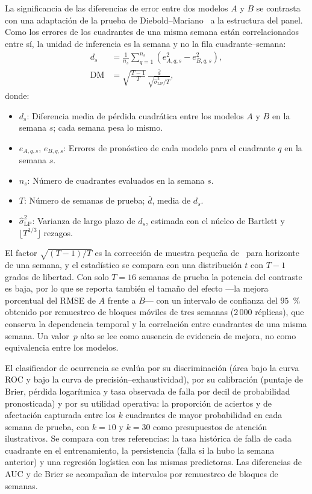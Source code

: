 La significancia de las diferencias de error entre dos modelos $A$ y $B$ se contrasta con una adaptación de la prueba de Diebold--Mariano~\cite{diebold1995} a la estructura del panel. Como los errores de los cuadrantes de una misma semana están correlacionados entre sí, la unidad de inferencia es la semana y no la fila cuadrante--semana:
\begin{equation}
    \begin{aligned}
    d_s &= \frac{1}{n_s}\sum_{q=1}^{n_s} \left( e_{A,q,s}^{2} - e_{B,q,s}^{2} \right), \\
    \mathrm{DM} &= \sqrt{\frac{T-1}{T}}\,\frac{\bar{d}}{\sqrt{\hat{\sigma}^{2}_{\mathrm{LP}}/T}},
    \end{aligned}
    \label{eq:dm_semanal}
\end{equation}
donde:
\begin{itemize}
    \item $d_s$: Diferencia media de pérdida cuadrática entre los modelos $A$ y $B$ en la semana $s$; cada semana pesa lo mismo.
    \item $e_{A,q,s}$, $e_{B,q,s}$: Errores de pronóstico de cada modelo para el cuadrante $q$ en la semana $s$.
    \item $n_s$: Número de cuadrantes evaluados en la semana $s$.
    \item $T$: Número de semanas de prueba; $\bar{d}$, media de $d_s$.
    \item $\hat{\sigma}^{2}_{\mathrm{LP}}$: Varianza de largo plazo de $d_s$, estimada con el núcleo de Bartlett y $\lfloor T^{1/3}\rfloor$ rezagos.
\end{itemize}
El factor $\sqrt{(T-1)/T}$ es la corrección de muestra pequeña de~\cite{harvey1997} para horizonte de una semana, y el estadístico se compara con una distribución $t$ con $T-1$ grados de libertad. Con solo $T=16$ semanas de prueba la potencia del contraste es baja, por lo que se reporta también el tamaño del efecto ---la mejora porcentual del RMSE de $A$ frente a $B$--- con un intervalo de confianza del $95$~\% obtenido por remuestreo de bloques móviles de tres semanas ($2\,000$ réplicas), que conserva la dependencia temporal y la correlación entre cuadrantes de una misma semana. Un valor~$p$ alto se lee como ausencia de evidencia de mejora, no como equivalencia entre los modelos.

El clasificador de ocurrencia se evalúa por su discriminación (área bajo la curva ROC y bajo la curva de precisión--exhaustividad), por su calibración (puntaje de Brier, pérdida logarítmica y tasa observada de falla por decil de probabilidad pronosticada) y por su utilidad operativa: la proporción de aciertos y de afectación capturada entre los $k$ cuadrantes de mayor probabilidad en cada semana de prueba, con $k=10$ y $k=30$ como presupuestos de atención ilustrativos. Se compara con tres referencias: la tasa histórica de falla de cada cuadrante en el entrenamiento, la persistencia (falla si la hubo la semana anterior) y una regresión logística con las mismas predictoras. Las diferencias de AUC y de Brier se acompañan de intervalos por remuestreo de bloques de semanas.

